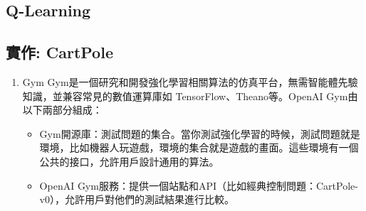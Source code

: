 \documentclass[a4paper,12pt]{article}
\begin{document}
\subsection{Q-Learning}
\label{sec:org77a15ce}
\subsection{實作: CartPole}
\label{sec:orgb2da449}
\begin{enumerate}
\item Gym
\label{sec:org6fc58a5}
Gym是一個研究和開發強化學習相關算法的仿真平台，無需智能體先驗知識，並兼容常見的數值運算庫如 TensorFlow、Theano等。OpenAI Gym由以下兩部分組成：\\
\begin{itemize}
\item Gym開源庫：測試問題的集合。當你測試強化學習的時候，測試問題就是環境，比如機器人玩遊戲，環境的集合就是遊戲的畫面。這些環境有一個公共的接口，允許用戶設計通用的算法。\\
\item OpenAI Gym服務：提供一個站點和API（比如經典控制問題：CartPole-v0），允許用戶對他們的測試結果進行比較。\\
\end{itemize}


\end{enumerate}
\end{document}
